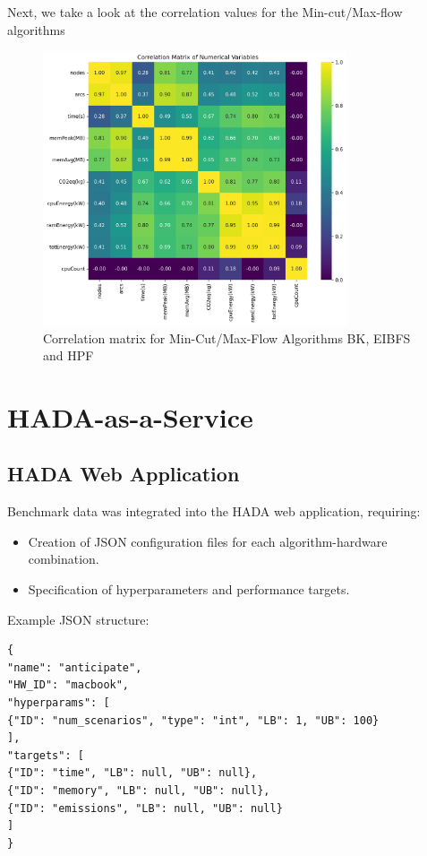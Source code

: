 \documentclass[a4paper,singleside,12pt]{report} %
\begin{document}
Next, we take a look at the correlation values for the Min-cut/Max-flow algorithms

\begin{figure}[h!]
    \centering
    \includegraphics[width=0.8\textwidth]{imgs/max_flow_corr_mat.png}
    \caption{Correlation matrix for Min-Cut/Max-Flow Algorithms BK, EIBFS and HPF}
    \label{fig:max_flow_corr_mat}
\end{figure}

\chapter{HADA-as-a-Service}

\section{HADA Web Application}
Benchmark data was integrated into the HADA web application, requiring:
\begin{itemize}
\item Creation of JSON configuration files for each algorithm-hardware combination.
\item Specification of hyperparameters and performance targets.
\end{itemize}

Example JSON structure:
\begin{verbatim}
{
"name": "anticipate",
"HW_ID": "macbook",
"hyperparams": [
{"ID": "num_scenarios", "type": "int", "LB": 1, "UB": 100}
],
"targets": [
{"ID": "time", "LB": null, "UB": null},
{"ID": "memory", "LB": null, "UB": null},
{"ID": "emissions", "LB": null, "UB": null}
]
}
\end{verbatim}
\end{document}

